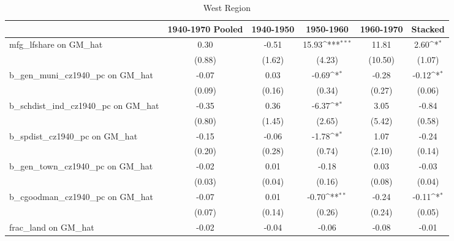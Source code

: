 \begin{table}[htbp]\centering
\def\sym#1{\ifmmode^{#1}\else\(^{#1}\)\fi}
\caption{West Region}
\begin{tabular}{l*{5}{c}}
\toprule
                &\multicolumn{1}{c}{1940-1970 Pooled}&\multicolumn{1}{c}{1940-1950}&\multicolumn{1}{c}{1950-1960}&\multicolumn{1}{c}{1960-1970}&\multicolumn{1}{c}{Stacked}\\
\midrule
mfg\_lfshare on GM\_hat&     0.30         &    -0.51         &    15.93\sym{***}&    11.81         &     2.60\sym{*}  \\
                &   (0.88)         &   (1.62)         &   (4.23)         &  (10.50)         &   (1.07)         \\
\addlinespace
b\_gen\_muni\_cz1940\_pc on GM\_hat&    -0.07         &     0.03         &    -0.69\sym{*}  &    -0.28         &    -0.12\sym{*}  \\
                &   (0.09)         &   (0.16)         &   (0.34)         &   (0.27)         &   (0.06)         \\
\addlinespace
b\_schdist\_ind\_cz1940\_pc on GM\_hat&    -0.35         &     0.36         &    -6.37\sym{*}  &     3.05         &    -0.84         \\
                &   (0.80)         &   (1.45)         &   (2.65)         &   (5.42)         &   (0.58)         \\
\addlinespace
b\_spdist\_cz1940\_pc on GM\_hat&    -0.15         &    -0.06         &    -1.78\sym{*}  &     1.07         &    -0.24         \\
                &   (0.20)         &   (0.28)         &   (0.74)         &   (2.10)         &   (0.14)         \\
\addlinespace
b\_gen\_town\_cz1940\_pc on GM\_hat&    -0.02         &     0.01         &    -0.18         &     0.03         &    -0.03         \\
                &   (0.03)         &   (0.04)         &   (0.16)         &   (0.08)         &   (0.04)         \\
\addlinespace
b\_cgoodman\_cz1940\_pc on GM\_hat&    -0.07         &     0.01         &    -0.70\sym{**} &    -0.24         &    -0.11\sym{*}  \\
                &   (0.07)         &   (0.14)         &   (0.26)         &   (0.24)         &   (0.05)         \\
\addlinespace
frac\_land on GM\_hat&    -0.02         &    -0.04         &    -0.06         &    -0.08         &    -0.01         \\

\end{tabular}
\end{table}
